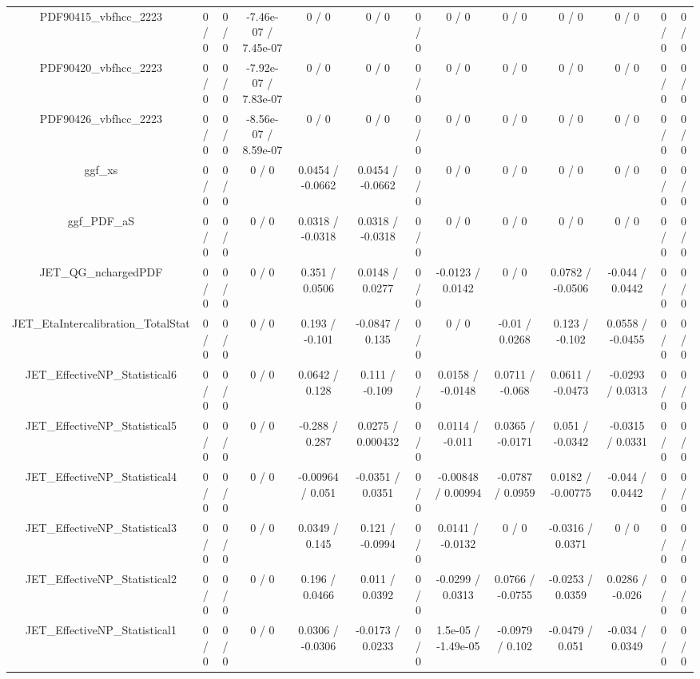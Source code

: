 \documentclass[10pt]{article}
\begin{document}
\begin{table}[htbp]
\begin{center}
\begin{tabular}{|c|c|c|c|c|c|c|c|c|c|c|c|c|}
  PDF90415_vbfhcc_2223 & 0 / 0 & 0 / 0 & -7.46e-07 / 7.45e-07 & 0 / 0 & 0 / 0 & 0 / 0 & 0 / 0 & 0 / 0 & 0 / 0 & 0 / 0 & 0 / 0 & 0 / 0 \\ 
  PDF90420_vbfhcc_2223 & 0 / 0 & 0 / 0 & -7.92e-07 / 7.83e-07 & 0 / 0 & 0 / 0 & 0 / 0 & 0 / 0 & 0 / 0 & 0 / 0 & 0 / 0 & 0 / 0 & 0 / 0 \\ 
  PDF90426_vbfhcc_2223 & 0 / 0 & 0 / 0 & -8.56e-07 / 8.59e-07 & 0 / 0 & 0 / 0 & 0 / 0 & 0 / 0 & 0 / 0 & 0 / 0 & 0 / 0 & 0 / 0 & 0 / 0 \\ 
  ggf_xs & 0 / 0 & 0 / 0 & 0 / 0 & 0.0454 / -0.0662 & 0.0454 / -0.0662 & 0 / 0 & 0 / 0 & 0 / 0 & 0 / 0 & 0 / 0 & 0 / 0 & 0 / 0 \\ 
  ggf_PDF_aS & 0 / 0 & 0 / 0 & 0 / 0 & 0.0318 / -0.0318 & 0.0318 / -0.0318 & 0 / 0 & 0 / 0 & 0 / 0 & 0 / 0 & 0 / 0 & 0 / 0 & 0 / 0 \\ 
  JET_QG_nchargedPDF & 0 / 0 & 0 / 0 & 0 / 0 & 0.351 / 0.0506 & 0.0148 / 0.0277 & 0 / 0 & -0.0123 / 0.0142 & 0 / 0 & 0.0782 / -0.0506 & -0.044 / 0.0442 & 0 / 0 & 0 / 0 \\ 
  JET_EtaIntercalibration_TotalStat & 0 / 0 & 0 / 0 & 0 / 0 & 0.193 / -0.101 & -0.0847 / 0.135 & 0 / 0 & 0 / 0 & -0.01 / 0.0268 & 0.123 / -0.102 & 0.0558 / -0.0455 & 0 / 0 & 0 / 0 \\ 
  JET_EffectiveNP_Statistical6 & 0 / 0 & 0 / 0 & 0 / 0 & 0.0642 / 0.128 & 0.111 / -0.109 & 0 / 0 & 0.0158 / -0.0148 & 0.0711 / -0.068 & 0.0611 / -0.0473 & -0.0293 / 0.0313 & 0 / 0 & 0 / 0 \\ 
  JET_EffectiveNP_Statistical5 & 0 / 0 & 0 / 0 & 0 / 0 & -0.288 / 0.287 & 0.0275 / 0.000432 & 0 / 0 & 0.0114 / -0.011 & 0.0365 / -0.0171 & 0.051 / -0.0342 & -0.0315 / 0.0331 & 0 / 0 & 0 / 0 \\ 
  JET_EffectiveNP_Statistical4 & 0 / 0 & 0 / 0 & 0 / 0 & -0.00964 / 0.051 & -0.0351 / 0.0351 & 0 / 0 & -0.00848 / 0.00994 & -0.0787 / 0.0959 & 0.0182 / -0.00775 & -0.044 / 0.0442 & 0 / 0 & 0 / 0 \\ 
  JET_EffectiveNP_Statistical3 & 0 / 0 & 0 / 0 & 0 / 0 & 0.0349 / 0.145 & 0.121 / -0.0994 & 0 / 0 & 0.0141 / -0.0132 & 0 / 0 & -0.0316 / 0.0371 & 0 / 0 & 0 / 0 & 0 / 0 \\ 
  JET_EffectiveNP_Statistical2 & 0 / 0 & 0 / 0 & 0 / 0 & 0.196 / 0.0466 & 0.011 / 0.0392 & 0 / 0 & -0.0299 / 0.0313 & 0.0766 / -0.0755 & -0.0253 / 0.0359 & 0.0286 / -0.026 & 0 / 0 & 0 / 0 \\ 
  JET_EffectiveNP_Statistical1 & 0 / 0 & 0 / 0 & 0 / 0 & 0.0306 / -0.0306 & -0.0173 / 0.0233 & 0 / 0 & 1.5e-05 / -1.49e-05 & -0.0979 / 0.102 & -0.0479 / 0.051 & -0.034 / 0.0349 & 0 / 0 & 0 / 0 \\ 

\end{tabular}
\end{center}
\end{table}
\end{document}
